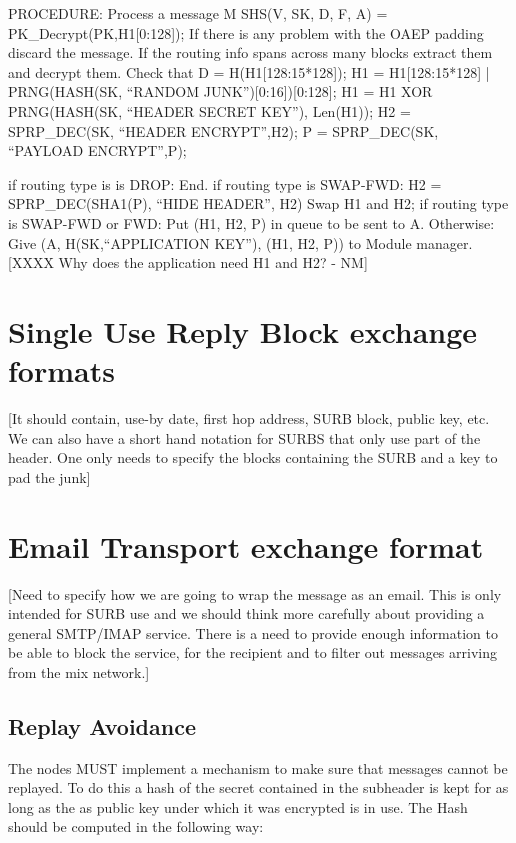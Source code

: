 PROCEDURE: Process a message M
	SHS(V, SK, D, F, A) = PK_Decrypt(PK,H1[0:128]);
	If there is any problem with the OAEP padding discard the message.
	If the routing info spans across many blocks extract them and
		decrypt them. 
	Check that D = H(H1[128:15*128]);
	H1 = H1[128:15*128] | PRNG(HASH(SK, ``RANDOM
						JUNK'')[0:16])[0:128];
	H1 = H1 XOR PRNG(HASH(SK, ``HEADER SECRET KEY''), Len(H1));
	H2 = SPRP_DEC(SK, ``HEADER ENCRYPT'',H2);
	P = SPRP_DEC(SK, ``PAYLOAD ENCRYPT'',P);

	if routing type is is DROP:
                End.
	if routing type is SWAP-FWD:
		H2 = SPRP_DEC(SHA1(P), ``HIDE HEADER'', H2)
		Swap H1 and H2;
        if routing type is SWAP-FWD or FWD:
	   	Put (H1, H2, P) in queue to be sent to A.
        Otherwise:
		Give (A, H(SK,``APPLICATION KEY''), (H1, H2, P)) to
		Module manager. 
                  [XXXX Why does the application need H1 and H2? - NM]

\section{Single Use Reply Block exchange formats}

[It should contain, use-by date, first hop address, 
 SURB block, public key, etc.
 We can also have a short hand notation for SURBS that only
 use part of the header. One only needs to specify the 
 blocks containing the SURB and a key to pad the junk]

\section{Email Transport exchange format}

[Need to specify how we are going to wrap the message
 as an email. This is only intended for SURB use and
 we should think more carefully about providing a 
 general SMTP/IMAP service.
 There is a need to provide enough information to be 
 able to block the service, for the recipient and to
 filter out messages arriving from the mix network.]

\subsection{Replay Avoidance}

The nodes MUST implement a mechanism to make sure that messages cannot
be replayed. To do this a hash of the secret contained in the
subheader is kept for as long as the as public key under which it was
encrypted is in use. The Hash should be computed in the following way:

